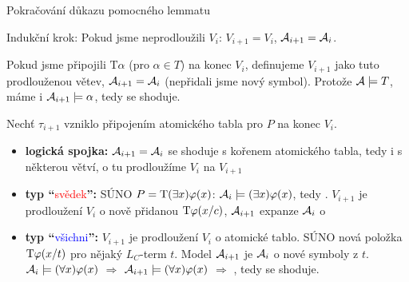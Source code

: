 \documentclass{beamer}
\begin{document}
\begin{frame}{Pokračování důkazu pomocného lemmatu}

    \vspace{-6pt}
    \alert{Indukční krok:} Pokud jsme neprodloužili $V_i$: $V_{i+1}=V_i$, $\mathcal{A}_{i+1}=\mathcal{A}_i$.

    \vspace{-3pt}

    Pokud jsme připojili $\mathrm{T}\alpha$ (pro $\alpha\in T$) na konec $V_i$, definujeme $V_{i+1}$ jako tuto prodlouženou větev, $\mathcal{A}_{i+1}=\mathcal{A}_i$ (nepřidali jsme nový symbol). Protože $\mathcal{A}\models T$, máme i $\mathcal{A}_{i+1}\models\alpha$, tedy se shoduje.
  
    Nechť $\tau_{i+1}$ vzniklo připojením atomického tabla pro $P$ na konec $V_i$.

    \vspace{-3pt}
    
    \begin{itemize}
        \item \textbf{logická spojka:} $\mathcal{A}_{i+1}=\mathcal{A}_i$ se shoduje s kořenem atomického tabla, tedy i s některou větví, o tu prodloužíme $V_i$ na $V_{i+1}$
        
        \medskip

        \item \textbf{typ ``}\textcolor{red}{svědek}\textbf{'':} SÚNO $P=\mathrm{T}(\exists x)\varphi(x)$: $\mathcal{A}_i\models(\exists x)\varphi(x)$, tedy . $V_{i+1}$ je prodloužení $V_i$ o nově přidanou $\mathrm{T}\varphi(x/c)$, $\mathcal{A}_{i+1}$ expanze $\mathcal{A}_i$ o 
        
        \medskip

        \item \textbf{typ ``}\textcolor{blue}{všichni}\textbf{'':} $V_{i+1}$ je prodloužení $V_i$ o atomické tablo. SÚNO nová položka $\mathrm{T}\varphi(x/t)$ pro nějaký $L_C$-term $t$. 
        Model $\mathcal{A}_{i+1}$ je  $\mathcal{A}_i$ o nové symboly z $t$.    
        $\mathcal{A}_i\models(\forall x)\varphi(x)$ $\Rightarrow$ $\mathcal{A}_{i+1}\models(\forall x)\varphi(x)$ $\Rightarrow$ , tedy se shoduje. \hfill\qedsymbol
    \end{itemize}

\end{frame}
\end{document}
